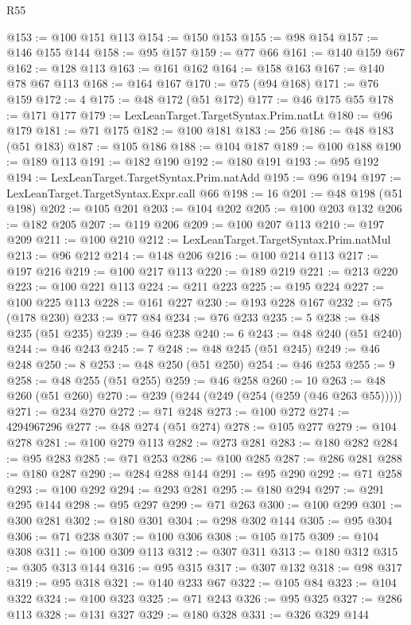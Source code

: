 \begin{lexlean}{R55}
\begin{coremodule}
@153 := @100 @151 @113
@154 := @150 @153
@155 := @98 @154
@157 := @146 @155 @144
@158 := @95 @157
@159 := @77 @66
@161 := @140 @159 @67
@162 := @128 @113
@163 := @161 @162
@164 := @158 @163
@167 := @140 @78 @67 @113
@168 := @164 @167
@170 := @75 (@94 @168)
@171 := @76 @159
@172 := 4
@175 := @48 @172 (@51 @172)
@177 := @46 @175 @55
@178 := @171 @177
@179 := LexLeanTarget.TargetSyntax.Prim.natLt
@180 := @96 @179
@181 := @71 @175
@182 := @100 @181
@183 := 256
@186 := @48 @183 (@51 @183)
@187 := @105 @186
@188 := @104 @187
@189 := @100 @188
@190 := @189 @113
@191 := @182 @190
@192 := @180 @191
@193 := @95 @192
@194 := LexLeanTarget.TargetSyntax.Prim.natAdd
@195 := @96 @194
@197 := LexLeanTarget.TargetSyntax.Expr.call @66
@198 := 16
@201 := @48 @198 (@51 @198)
@202 := @105 @201
@203 := @104 @202
@205 := @100 @203 @132
@206 := @182 @205
@207 := @119 @206
@209 := @100 @207 @113
@210 := @197 @209
@211 := @100 @210
@212 := LexLeanTarget.TargetSyntax.Prim.natMul
@213 := @96 @212
@214 := @148 @206
@216 := @100 @214 @113
@217 := @197 @216
@219 := @100 @217 @113
@220 := @189 @219
@221 := @213 @220
@223 := @100 @221 @113
@224 := @211 @223
@225 := @195 @224
@227 := @100 @225 @113
@228 := @161 @227
@230 := @193 @228 @167
@232 := @75 (@178 @230)
@233 := @77 @84
@234 := @76 @233
@235 := 5
@238 := @48 @235 (@51 @235)
@239 := @46 @238
@240 := 6
@243 := @48 @240 (@51 @240)
@244 := @46 @243
@245 := 7
@248 := @48 @245 (@51 @245)
@249 := @46 @248
@250 := 8
@253 := @48 @250 (@51 @250)
@254 := @46 @253
@255 := 9
@258 := @48 @255 (@51 @255)
@259 := @46 @258
@260 := 10
@263 := @48 @260 (@51 @260)
@270 := @239 (@244 (@249 (@254 (@259 (@46 @263 @55)))))
@271 := @234 @270
@272 := @71 @248
@273 := @100 @272
@274 := 4294967296
@277 := @48 @274 (@51 @274)
@278 := @105 @277
@279 := @104 @278
@281 := @100 @279 @113
@282 := @273 @281
@283 := @180 @282
@284 := @95 @283
@285 := @71 @253
@286 := @100 @285
@287 := @286 @281
@288 := @180 @287
@290 := @284 @288 @144
@291 := @95 @290
@292 := @71 @258
@293 := @100 @292
@294 := @293 @281
@295 := @180 @294
@297 := @291 @295 @144
@298 := @95 @297
@299 := @71 @263
@300 := @100 @299
@301 := @300 @281
@302 := @180 @301
@304 := @298 @302 @144
@305 := @95 @304
@306 := @71 @238
@307 := @100 @306
@308 := @105 @175
@309 := @104 @308
@311 := @100 @309 @113
@312 := @307 @311
@313 := @180 @312
@315 := @305 @313 @144
@316 := @95 @315
@317 := @307 @132
@318 := @98 @317
@319 := @95 @318
@321 := @140 @233 @67
@322 := @105 @84
@323 := @104 @322
@324 := @100 @323
@325 := @71 @243
@326 := @95 @325
@327 := @286 @113
@328 := @131 @327
@329 := @180 @328
@331 := @326 @329 @144

\end{coremodule}
\end{lexlean}
